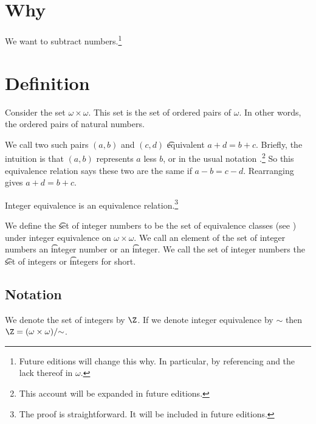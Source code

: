 

\section*{Why}

We want to subtract numbers.\footnote{Future editions will change this why. In particular, by referencing and the lack thereof in $\omega $.}

\section*{Definition}

Consider the set $\omega  \times \omega $.
This set is the set of ordered pairs of $\omega $.
In other words, the ordered pairs of natural numbers.

We call two such pairs $(a, b)$ and $(c, d)$ \t{equivalent} $a + d = b + c$.
Briefly, the intuition is that $(a, b)$ represents $a$ less $b$, or in the usual notation .\footnote{This account will be expanded in future editions.}
So this equivalence relation says these two are the same if $a - b = c - d$.
Rearranging gives $a + d = b + c$.

\begin{proposition}
Integer equivalence is an equivalence relation.\footnote{The proof is straightforward. It will be included in future editions.}\end{proposition}
We define the \t{set of integer numbers} to be the set of equivalence classes (see ) under integer equivalence on $\omega  \times \omega $.
We call an element of the set of integer numbers an \t{integer number} or an \t{integer}.
We call the set of integer numbers the \t{set of integers} or \t{integers} for short.

\subsection*{Notation}

We denote the set of integers by $\Z $.
If we denote integer equivalence by $\sim$ then $\Z  = (\omega \times \omega )/\mathord{\sim}$.
